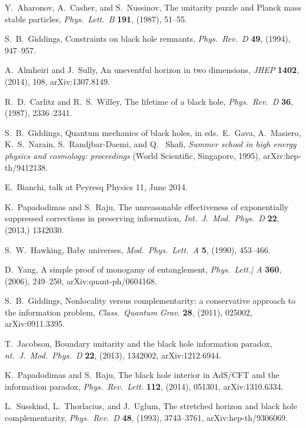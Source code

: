 \documentclass[12pt]{article}
\begin{document}
\begin{thebibliography}{999}
 Y.\ Aharonov, A.\ Casher, and S.\ Nussinov,
The unitarity puzzle and Planck mass stable particles,
\emph{Phys.\ Lett.\ B} {\bf 191}, (1987), 51--55.

 S.~B.\ Giddings, Constraints on black hole 
remnants, \emph{Phys.\ Rev.\ D} {\bf 49}, (1994), 947--957.

 A.\ Almheiri and J.\ Sully, An uneventful 
horizon in two dimensions, \emph{JHEP} {\bf 1402}, (2014),
108, arXiv:1307.8149.

 R.~D.\ Carlitz and R.~S.\ Willey, The
lifetime of a black hole, \emph{Phys.\ Rev.\ D} {\bf 36},
(1987), 2336--2341.

 S.~B.\ Giddings, Quantum mechanics of 
black holes, in eds.\  E.\ Gava, A.\ Masiero, K.~S.\ Narain, 
S.\ Randjbar-Daemi, and Q. \ Shafi, \emph{Summer school in
high energy physics and cosmology: proceedings} (World
Scientific, Singapore, 1995), arXiv:hep-th/9412138.

 E.\ Bianchi, talk at Peyresq Physics 11, 
June 2014.

 K.\ Papadodimas and S.\ Raju,
The unreasonable effectiveness of exponentially suppressed 
corrections in preserving information, \emph{Int.\ J.\ Mod.\ Phys.\ D}
{\bf 22},  (2013,) 1342030.

 S.~W.\ Hawking, Baby universes, 
\emph{Mod.\ Phys.\ Lett.\ A} {\bf 5}, (1990), 453--466.

 D.\ Yang, A simple proof of monogamy of
entanglement, \emph{Phys.\ Lett.| A} {\bf 360}, (2006), 249--250,
arXiv:quant-ph/0604168.

 S.~B.\ Giddings, Nonlocality versus complementarity: 
a conservative approach to the information problem, \emph{Class.\
Quantum Grav.} {\bf 28}, (2011), 025002, arXiv:0911.3395.

 T.\ Jacobson, Boundary unitarity and the black 
hole information paradox, \emph{nt.\ J.\ Mod.\ Phys.\ D} {\bf 22}, 
(2013), 1342002, arXiv:1212.6944.

  K.\ Papadodimas and S.\ Raju,
The black hole interior in AdS/CFT and the information paradox,
\emph{Phys.\ Rev.\ Lett.} {\bf 112}, (2014), 051301,
arXiv:1310.6334.

 L.\ Susskind, L.\ Thorlacius, and J.\ Uglum,
The stretched horizon and black hole complementarity,
\emph{Phys.\ Rev.\ D} {\bf 48}, (1993), 3743--3761,
arXiv:hep-th/9306069.


\end{thebibliography}
\end{document}
